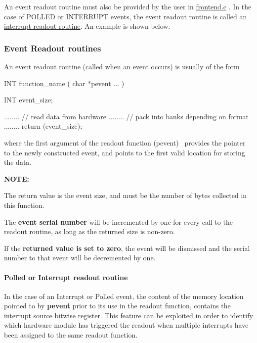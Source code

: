 An event readout routine must also be provided by the user in \hyperlink{frontend_8c}{frontend.c} . In the case of POLLED or INTERRUPT events, the event readout routine is called an \hyperlink{FE_eq_event_routines_FE_poll_or_interrupt_readout_routine}{interrupt readout routine}. An example is shown below.

\par


\par
\hypertarget{FE_eq_event_routines_FE_readout_routine}{}\subsubsection{Event Readout routines}\label{FE_eq_event_routines_FE_readout_routine}
An event readout routine (called when an event occurs) is usually of the form 
\begin{DoxyCode}
INT function_name ( char *pevent ... )
{
   INT event_size;

   ........  // read data from hardware
   ........  // pack into banks depending on format
   ........
   return (event_size);
}
\end{DoxyCode}
 where the first argument of the readout function (pevent)~ provides the pointer to the newly constructed event, and points to the first valid location for storing the data. \par
 {\bfseries NOTE:} 
\begin{DoxyItemize}
\item The return value is the event size, and must be the number of bytes collected in this function.  
\item The {\bfseries event serial number} will be incremented by one for every call to the readout routine, as long as the returned size is non-\/zero.  
\item If the {\bfseries returned value is set to zero}, the event will be dismissed and the serial number to that event will be decremented by one.  
\end{DoxyItemize}\par


\par
 \hypertarget{FE_eq_event_routines_FE_poll_or_interrupt_readout_routine}{}\paragraph{Polled or Interrupt readout routine}\label{FE_eq_event_routines_FE_poll_or_interrupt_readout_routine}
In the case of an Interrupt or Polled event, the content of the memory location pointed to by {\bfseries pevent} prior to its use in the readout function, contains the interrupt source bitwise register. This feature can be exploited in order to identify which hardware module has triggered the readout when multiple interrupts have been assigned to the same readout function.

